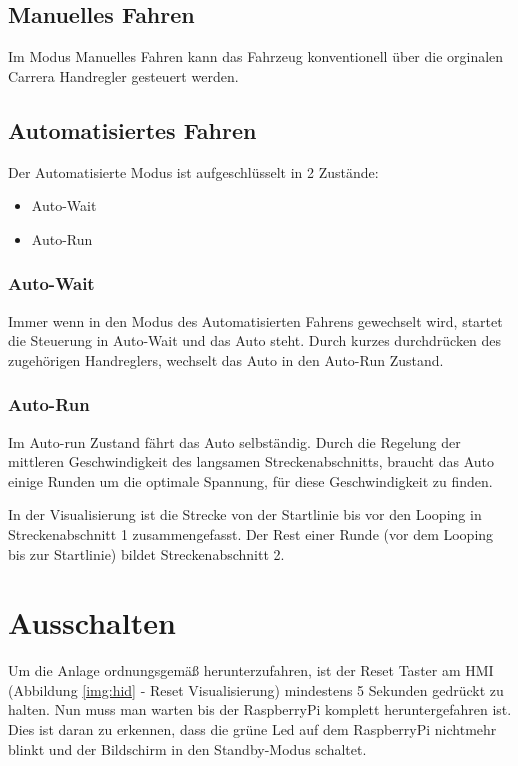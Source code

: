 \documentclass[a4paper, 11pt]{report}
\begin{document}
	\subsection{Manuelles Fahren}\label{subsec:ManuellesFahren}
		Im Modus Manuelles Fahren kann das Fahrzeug konventionell über die orginalen Carrera Handregler gesteuert
		werden.
\newpage
	\subsection{Automatisiertes Fahren}
		Der Automatisierte Modus ist aufgeschlüsselt in 2 Zustände:
		\begin{itemize}
			\item Auto-Wait
			\item Auto-Run
		\end{itemize}
		\subsubsection{Auto-Wait}
		Immer wenn in den Modus des Automatisierten Fahrens gewechselt wird, startet die Steuerung in
		Auto-Wait und das Auto steht.
		Durch kurzes durchdrücken des zugehörigen Handreglers, wechselt das Auto in den Auto-Run Zustand.
		\subsubsection{Auto-Run}
			Im Auto-run Zustand fährt das Auto selbständig. Durch die Regelung der mittleren Geschwindigkeit des langsamen Streckenabschnitts, braucht das Auto einige Runden um die optimale Spannung, für diese Geschwindigkeit zu finden.

			In der Visualisierung ist die Strecke von der Startlinie bis vor den Looping in Streckenabschnitt 1 zusammengefasst.
			Der Rest einer Runde (vor dem Looping bis zur Startlinie) bildet Streckenabschnitt 2.
\section{Ausschalten}
Um die Anlage ordnungsgemäß herunterzufahren, ist der Reset Taster am HMI (Abbildung \ref{img:hid} - Reset Visualisierung) mindestens 5 Sekunden gedrückt zu halten.
Nun muss man warten bis der RaspberryPi komplett heruntergefahren ist. Dies ist daran zu erkennen, dass die grüne Led auf dem RaspberryPi nichtmehr blinkt und der Bildschirm in den Standby-Modus schaltet.
\end{document}
